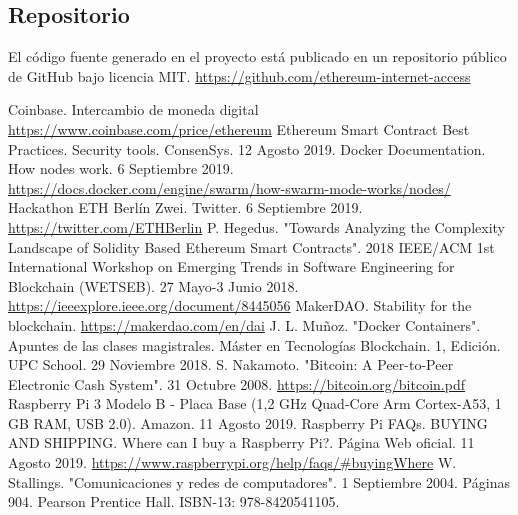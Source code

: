 \documentclass[9pt,oneside]{amsart}
\begin{document}
\begin{multicols}{2}
\section{Repositorio}\label{sec:repository}
El código fuente generado en el proyecto está publicado en un repositorio público de GitHub bajo licencia MIT.
\newline\newline
\url{https://github.com/ethereum-internet-access}
\newline
\begin{thebibliography}{9}
 Coinbase. Intercambio de moneda digital \href{https://www.coinbase.com/price/ethereum}{https://www.coinbase.com/price/ethereum}
 Ethereum Smart Contract Best Practices. Security tools. ConsenSys. 12 Agosto 2019.
 Docker Documentation. How nodes work. 6 Septiembre 2019.  \href{https://docs.docker.com/engine/swarm/how-swarm-mode-works/nodes/}{https://docs.docker.com/engine/swarm/how-swarm-mode-works/nodes/}
 Hackathon ETH Berlín Zwei. Twitter. 6 Septiembre 2019. \href{https://twitter.com/ETHBerlin}{https://twitter.com/ETHBerlin}
 P. Hegedus. "Towards Analyzing the Complexity Landscape of Solidity Based Ethereum Smart Contracts". 2018 IEEE/ACM 1st International Workshop on Emerging Trends in Software Engineering for Blockchain (WETSEB). 27 Mayo-3 Junio 2018. \href{https://ieeexplore.ieee.org/document/8445056}{https://ieeexplore.ieee.org/document/8445056}
 MakerDAO. Stability for the blockchain.  \href{https://makerdao.com/en/dai}{https://makerdao.com/en/dai}
 J. L. Muñoz. "Docker Containers". Apuntes de las clases magistrales. Máster en Tecnologías Blockchain. 1, Edición. UPC School. 29 Noviembre 2018.
 S. Nakamoto. "Bitcoin: A Peer-to-Peer Electronic Cash System". 31 Octubre 2008.  \href{https://bitcoin.org/bitcoin.pdf}{https://bitcoin.org/bitcoin.pdf}
 Raspberry Pi 3 Modelo B - Placa Base (1,2 GHz Quad-Core Arm Cortex-A53, 1 GB RAM, USB 2.0). Amazon. 11 Agosto 2019.
 Raspberry Pi FAQs. BUYING AND SHIPPING. Where can I buy a Raspberry Pi?. Página Web oficial. 11 Agosto 2019.  \href{https://www.raspberrypi.org/help/faqs/#buyingWhere}{https://www.raspberrypi.org/help/faqs/\#buyingWhere}
 W. Stallings. "Comunicaciones y redes de computadores". 1 Septiembre 2004. Páginas 904. Pearson Prentice Hall. ISBN-13: 978-8420541105.
\end{thebibliography}
\clearpage

\end{multicols}
\end{document}
